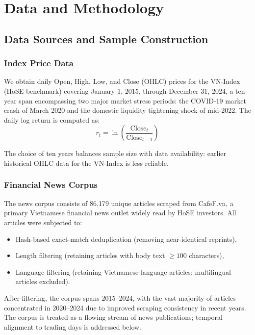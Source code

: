 \section{Data and Methodology}

\subsection{Data Sources and Sample Construction}

\subsubsection{Index Price Data}

We obtain daily Open, High, Low, and Close (OHLC) prices for the VN-Index (HoSE benchmark) covering January 1, 2015, through December 31, 2024, a ten-year span encompassing two major market stress periods: the COVID-19 market crash of March 2020 and the domestic liquidity tightening shock of mid-2022. The daily log return is computed as:
$$r_t = \ln\left(\frac{\text{Close}_t}{\text{Close}_{t-1}}\right)$$

The choice of ten years balances sample size with data availability: earlier historical OHLC data for the VN-Index is less reliable.

\subsubsection{Financial News Corpus}

The news corpus consists of 86,179 unique articles scraped from CafeF.vn, a primary Vietnamese financial news outlet widely read by HoSE investors. All articles were subjected to:
\begin{itemize}
    \item Hash-based exact-match deduplication (removing near-identical reprints),
    \item Length filtering (retaining articles with body text $\geq 100$ characters),
    \item Language filtering (retaining Vietnamese-language articles; multilingual articles excluded).
\end{itemize}

After filtering, the corpus spans 2015--2024, with the vast majority of articles concentrated in 2020--2024 due to improved scraping consistency in recent years. The corpus is treated as a flowing stream of news publications; temporal alignment to trading days is addressed below.

